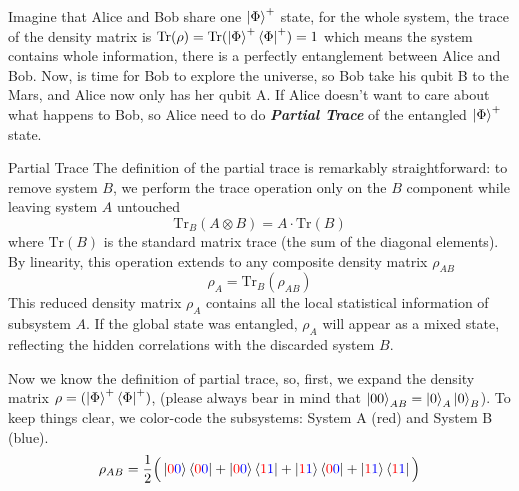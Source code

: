 \documentclass[11pt, letterpaper]{article}
\begin{document}
Imagine that Alice and Bob share one $\ket{\Phi}^+$ state, for the whole system, the trace of the density matrix is $\text{Tr}(\rho) = \text{Tr}(\ket{\Phi}^+\bra{\Phi}^+) = 1$ which means the system contains whole information, there is a perfectly entanglement between Alice and Bob. Now, is time for Bob to explore the universe, so Bob take his qubit B to the Mars, and Alice now only has her qubit A. If Alice doesn't want to care about what happens to Bob, so Alice need to do \textbf{\textit{Partial Trace}} of the entangled $\ket{\Phi}^+$ state. 
\begin{SBUBox}{Partial Trace}
  The definition of the partial trace is remarkably straightforward: to remove system $B$, we perform the trace operation only on the $B$ component while leaving system $A$ untouched
  \begin{equation*}
    \text{Tr}_B (A \otimes B) = A \cdot \text{Tr}(B)
  \end{equation*}
  where $\text{Tr}(B)$ is the standard matrix trace (the sum of the diagonal elements). By linearity, this operation extends to any composite density matrix $\rho_{AB}$
  \begin{equation*}
    \rho_A = \text{Tr}_B (\rho_{AB})
  \end{equation*}
  This reduced density matrix $\rho_A$ contains all the local statistical information of subsystem $A$. If the global state was entangled, $\rho_A$ will appear as a mixed state, reflecting the hidden correlations with the discarded system $B$.
\end{SBUBox}

Now we know the definition of partial trace, so, first, we expand the density matrix $\rho = (\ket{\Phi}^+\bra{\Phi}^+)$, (please always bear in mind that $\ket{00}_{AB} = \ket{0}_A\ket{0}_B$). To keep things clear, we color-code the subsystems: System A (red) and System B (blue).
\begin{equation}
  \rho_{AB} = \frac{1}{2} \Big(
  \ket{{\color{red} 0}{\color{blue} 0}}\bra{{\color{red} 0}{\color{blue} 0}} +
  \ket{{\color{red} 0}{\color{blue} 0}}\bra{{\color{red} 1}{\color{blue} 1}} +
  \ket{{\color{red} 1}{\color{blue} 1}}\bra{{\color{red} 0}{\color{blue} 0}} +
  \ket{{\color{red} 1}{\color{blue} 1}}\bra{{\color{red} 1}{\color{blue} 1}}
  \Big)
  \label{eq: full_density_ab}
\end{equation}
\end{document}
